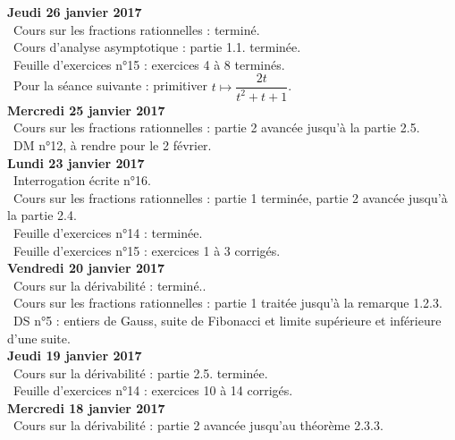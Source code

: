 \documentclass[12pt,a4paper]{article}
\begin{document}
\noindent\textbf{Jeudi 26 janvier 2017}\\
\bu\ Cours sur les fractions rationnelles : terminé.\\
\bu\ Cours d'analyse asymptotique : partie 1.1. terminée.\\
\bu\ Feuille d'exercices n°15 : exercices 4 à 8 terminés.\\
\bu\ Pour la séance suivante : primitiver $t\mapsto \dfrac{2t}{t^2+t+1}$.\vspace{.4cm}\\


\noindent\textbf{Mercredi 25 janvier 2017}\\
\bu\ Cours sur les fractions rationnelles : partie 2 avancée jusqu'à la partie 2.5.\\
\bu\ DM n°12, à rendre pour le 2 février.\vspace{.4cm}\\

\noindent\textbf{Lundi 23 janvier 2017}\\
\bu\ Interrogation écrite n°16.\\
\bu\ Cours sur les fractions rationnelles : partie 1 terminée, partie 2 avancée jusqu'à la partie 2.4.\\
\bu\ Feuille d'exercices n°14 : terminée.\\
\bu\ Feuille d'exercices n°15 : exercices 1 à 3 corrigés.\vspace{.4cm}\\

\noindent\textbf{Vendredi 20 janvier 2017}\\
\bu\ Cours sur la dérivabilité : terminé..\\
\bu\ Cours sur les fractions rationnelles : partie 1 traitée jusqu'à la remarque 1.2.3.\\
\bu\ DS n°5 : entiers de Gauss, suite de Fibonacci et limite supérieure et inférieure d'une suite.\vspace{.4cm}\\

\noindent\textbf{Jeudi 19 janvier 2017}\\
\bu\ Cours sur la dérivabilité : partie 2.5. terminée.\\
\bu\ Feuille d'exercices n°14 : exercices 10 à 14 corrigés.\vspace{.4cm}\\

\noindent\textbf{Mercredi 18 janvier 2017}\\
\bu\ Cours sur la dérivabilité : partie 2 avancée jusqu'au théorème 2.3.3.\vspace{.4cm}\\
\end{document}
